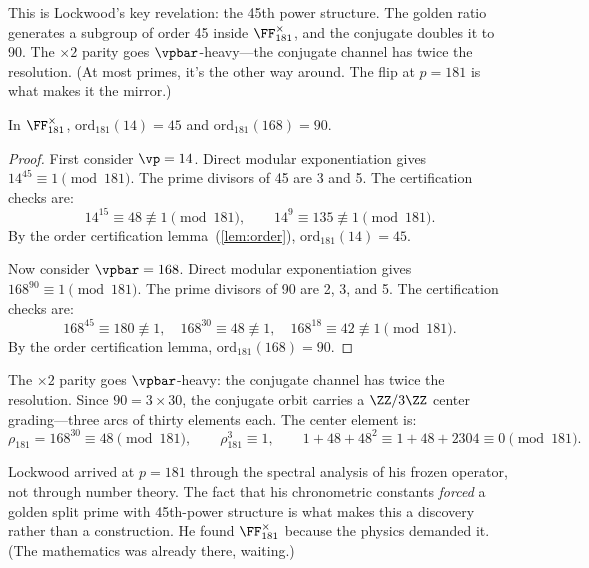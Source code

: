 This is Lockwood's key revelation: the 45th power structure. The golden ratio generates a subgroup of order 45 inside $\FF_{181}^\times$, and the conjugate doubles it to 90. The $\times 2$ parity goes $\vpbar$-heavy---the conjugate channel has twice the resolution. (At most primes, it's the other way around. The flip at $p = 181$ is what makes it the mirror.)

\begin{theorem}[Lockwood order theorem at $p = 181$]\label{thm:lockwood_mirror}
In $\FF_{181}^\times$, $\mathrm{ord}_{181}(14) = 45$ and $\mathrm{ord}_{181}(168) = 90$.
\end{theorem}

\begin{proof}
First consider $\vp = 14$. Direct modular exponentiation gives $14^{45} \equiv 1 \pmod{181}$. The prime divisors of 45 are 3 and 5. The certification checks are:
\[
14^{15} \equiv 48 \not\equiv 1 \pmod{181}, \qquad 14^{9} \equiv 135 \not\equiv 1 \pmod{181}.
\]
By the order certification lemma~(\ref{lem:order}), $\mathrm{ord}_{181}(14) = 45$.

Now consider $\vpbar = 168$. Direct modular exponentiation gives $168^{90} \equiv 1 \pmod{181}$. The prime divisors of 90 are 2, 3, and 5. The certification checks are:
\[
168^{45} \equiv 180 \not\equiv 1, \quad 168^{30} \equiv 48 \not\equiv 1, \quad 168^{18} \equiv 42 \not\equiv 1 \pmod{181}.
\]
By the order certification lemma, $\mathrm{ord}_{181}(168) = 90$. \qedhere
\end{proof}

The $\times 2$ parity goes $\vpbar$-heavy: the conjugate channel has twice the resolution. Since $90 = 3 \times 30$, the conjugate orbit carries a $\ZZ/3\ZZ$ center grading---three arcs of thirty elements each. The center element is:
\[
\rho_{181} = 168^{30} \equiv 48 \pmod{181}, \qquad \rho_{181}^3 \equiv 1, \qquad 1 + 48 + 48^2 \equiv 1 + 48 + 2304 \equiv 0 \pmod{181}.
\]

\begin{remark}
Lockwood arrived at $p = 181$ through the spectral analysis of his frozen operator, not through number theory. The fact that his chronometric constants \emph{forced} a golden split prime with 45th-power structure is what makes this a discovery rather than a construction. He found $\FF_{181}^\times$ because the physics demanded it. (The mathematics was already there, waiting.)
\end{remark}


